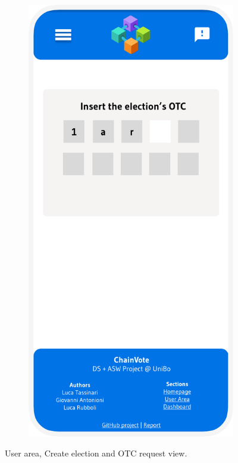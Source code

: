\documentclass{scrartcl}
\begin{document}
\begin{figure}[h]
\begin{subfigure}[b]{0.3\textwidth}
    \end{subfigure}
    \hfill
    \begin{subfigure}[b]{0.3\textwidth}
        \centering
        \includegraphics[width=\textwidth]{./figures/mockups/otc.pdf}
    \end{subfigure}
    \caption{User area, Create election and OTC request view.}
    \label{fig:user-area-view}
\end{figure}
\end{document}
